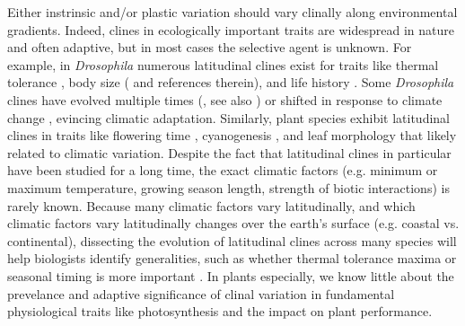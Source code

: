 \documentclass[11pt, oneside]{article}
\begin{document}
Either instrinsic and/or plastic variation should vary clinally along environmental gradients. Indeed, clines in ecologically important traits are widespread in nature \citep{Endler_1977} and often adaptive, but in most cases the selective agent is unknown. For example, in \textit{Drosophila} numerous latitudinal clines exist for traits like thermal tolerance \citep{Hoffmann_etal_2002}, body size (\cite{Coyne_Beecham_1987} and references therein), and life history \citep{Schmidt_etal_2005}. Some \textit{Drosophila} clines have evolved multiple times (\cite{Oakeshott_etal_1982, Huey_etal_2000}, see also \cite{Bradshaw_Holzapfel_2001}) or shifted in response to climate change \citep{Umina_etal_2005}, evincing climatic adaptation. Similarly, plant species exhibit latitudinal clines in traits like flowering time \citep{Stinchcombe_etal_2004}, cyanogenesis \citep{Kooyers_Olsen_2012}, and leaf morphology \citep{Hopkins_etal_2008} that likely related to climatic variation. Despite the fact that latitudinal clines in particular have been studied for a long time, the exact climatic factors (e.g. minimum or maximum temperature, growing season length, strength of biotic interactions) is rarely known. Because many climatic factors vary latitudinally, and which climatic factors vary latitudinally changes over the earth's surface (e.g. coastal vs. continental), dissecting the evolution of latitudinal clines across many species will help biologists identify generalities, such as whether thermal tolerance maxima or seasonal timing is more important \citep{Bradshaw_Holzapfel_2008}. In plants especially, we know little about the prevelance and adaptive significance of clinal variation in fundamental physiological traits like photosynthesis and the impact on plant performance.

\end{document}

